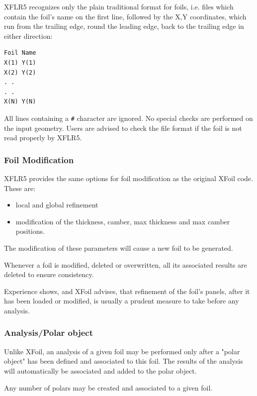 \documentclass[a4paper,twoside,12pt,dvips]{article}
\begin{document}
XFLR5 recognizes only the plain traditional format for foils, i.e. files
which contain the foil's name on the first line,
followed by the X,Y coordinates, which run from the trailing edge,
round the leading edge, back to the trailing edge in either direction:

\begin{verbatim}
Foil Name
X(1) Y(1)
X(2) Y(2)
. .
. .
X(N) Y(N)
\end{verbatim}

All lines containing a \texttt{\#} character are ignored.\newline
No special checks are performed on the input geometry. Users are advised
to check the file format if the foil is not read properly by XFLR5.

\subsubsection{Foil Modification}

XFLR5 provides the same options for foil modification as the original
XFoil code. These are:

\begin{itemize}
\item local and global refinement
\item modification of the thickness, camber, max thickness and max
camber positions.
\end{itemize}

The modification of these parameters will cause a new foil to be
generated.

Whenever a foil is modified, deleted or overwritten, all its
associated results are deleted to ensure consistency.

Experience shows, and XFoil advises, that refinement of the foil's
panels, after it has been loaded or modified, is usually a prudent
measure to take before any analysis.

\subsubsection{Analysis/Polar object}

Unlike XFoil, an analysis of a given foil may be performed only after
a "polar object" has been defined and associated to this foil. The
results of the analysis will automatically be associated and added to
the polar object.

Any number of polars may be created and associated to a given foil.
\end{document}
